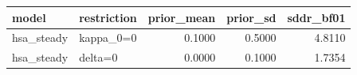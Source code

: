 \begin{tabular}{llrrr}
\toprule
model & restriction & prior\_mean & prior\_sd & sddr\_bf01 \\
\midrule
hsa\_steady & kappa\_0=0 & 0.1000 & 0.5000 & 4.8110 \\
hsa\_steady & delta=0 & 0.0000 & 0.1000 & 1.7354 \\
\bottomrule
\end{tabular}
